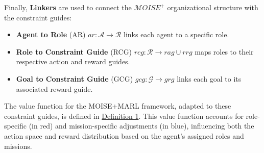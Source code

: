 \documentclass[conference]{IEEEtran}
\begin{document}
Finally, \textbf{Linkers} are used to connect the $\mathcal{M}OISE^+$ organizational structure with the constraint guides:
\begin{itemize}
    \item \textbf{Agent to Role} (AR) \quad $ar: \mathcal{A} \to \mathcal{R}$ links each agent to a specific role.
    \item \textbf{Role to Constraint Guide} (RCG) \quad $rcg: \mathcal{R} \rightarrow rag \cup rrg$ maps roles to their respective action and reward guides.
    \item \textbf{Goal to Constraint Guide} (GCG) \quad $gcg: \mathcal{G} \rightarrow grg$ links each goal to its associated reward guide.
\end{itemize}

The value function for the MOISE+MARL framework, adapted to these constraint guides, is defined in \hyperref[eq:single_value_function]{Definition 1}. This value function accounts for role-specific (in red) and mission-specific adjustments (in blue), influencing both the action space and reward distribution based on the agent's assigned roles and missions.
\end{document}
